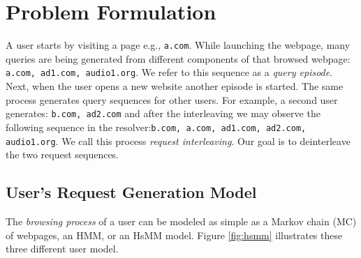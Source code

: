 	\section{Problem Formulation}
	\label{sec:gen}

	


	A user starts by visiting a page e.g., {\tt a.com}. While
        launching the webpage, many queries are being generated from
        different components of that browsed webpage: {\tt a.com, ad1.com,
        audio1.org}.  We refer to this sequence as a {\em query episode}.
        Next, when the user opens a new website another episode 
        is started.  The same process generates query
        sequences for other users.  For example, a second user generates: 
        {\tt b.com, ad2.com} and after the interleaving we may observe the
        following sequence in the resolver:{\tt  b.com, a.com, ad1.com,
        ad2.com, audio1.org}.
	We call this process \emph{request interleaving}.
	Our goal is to deinterleave the two request sequences. 
	
	\subsection{User's Request Generation Model}
	\label{subsec:user}
	The \emph{browsing process} of a user can be modeled as simple
        as a Markov chain (MC) of webpages, an HMM, or an HsMM model.
        Figure \ref{fig:hsmm} illustrates these three different user
        model.
	
